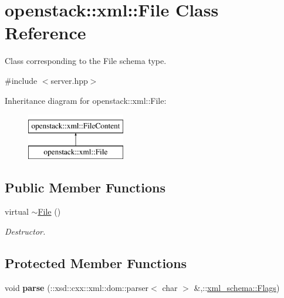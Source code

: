 \hypertarget{classopenstack_1_1xml_1_1File}{
\section{openstack::xml::File Class Reference}
\label{classopenstack_1_1xml_1_1File}
}


Class corresponding to the File schema type.  




{\ttfamily \#include $<$server.hpp$>$}

Inheritance diagram for openstack::xml::File:\begin{figure}[H]
\begin{center}
\leavevmode
\includegraphics[height=2.000000cm]{classopenstack_1_1xml_1_1File}
\end{center}
\end{figure}
\subsection*{Public Member Functions}
\begin{DoxyCompactItemize}
\item 
\hypertarget{classopenstack_1_1xml_1_1File_aa39529318cad61e787c6b26c5bc04b97}{
virtual \hyperlink{classopenstack_1_1xml_1_1File_aa39529318cad61e787c6b26c5bc04b97}{$\sim$File} ()}
\label{classopenstack_1_1xml_1_1File_aa39529318cad61e787c6b26c5bc04b97}

\begin{DoxyCompactList}\small\item\em Destructor. \item\end{DoxyCompactList}\end{DoxyCompactItemize}
\subsection*{Protected Member Functions}
\begin{DoxyCompactItemize}
\item 
\hypertarget{classopenstack_1_1xml_1_1File_a39f816071a1e6f61d48322d7e16451ca}{
void {\bfseries parse} (::xsd::cxx::xml::dom::parser$<$ char $>$ \&,::\hyperlink{namespacexml__schema_affb4c227cbd9aa7453dd1dc5a1401943}{xml\_\-schema::Flags})}
\label{classopenstack_1_1xml_1_1File_a39f816071a1e6f61d48322d7e16451ca}

\end{DoxyCompactItemize}
